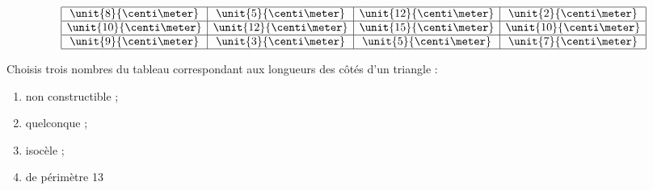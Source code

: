 
\begin{exercice}\label{exosmath-0770}


    \begin{equation*}
        \begin{array}[]{|c|c|c|c|}
            \hline
            \unit{8}{\centi\meter}&\unit{5}{\centi\meter}&\unit{12}{\centi\meter}&\unit{2}{\centi\meter}\\
            \hline
            \unit{10}{\centi\meter}&\unit{12}{\centi\meter}&\unit{15}{\centi\meter}&\unit{10}{\centi\meter}\\
            \hline
            \unit{9}{\centi\meter}&\unit{3}{\centi\meter}&\unit{5}{\centi\meter}&\unit{7}{\centi\meter}\\
            \hline
        \end{array}
    \end{equation*}

Choisis trois nombres du tableau correspondant aux longueurs des côtés d'un triangle :
\begin{multicols}{2}
    \begin{enumerate}
        \item
non constructible ;
\item
 quelconque ;
 \item isocèle ;
\item
    de périmètre \unit{13}{\centi\meter}
    \end{enumerate}
\end{multicols}

\end{exercice}
